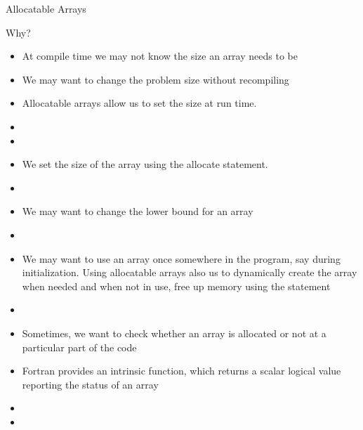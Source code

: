 \documentclass[10pt,t]{beamer}
\begin{document}
\begin{frame}{Allocatable Arrays}
  \begin{block}{\scriptsize Why?}
    \begin{itemize}
      \item At compile time we may not know the size an array needs to be
      \item We may want to change the problem size without recompiling
    \end{itemize}
  \end{block}
  \begin{itemize}
    \item Allocatable arrays allow us to set the size at run time.
    \item[] 
    \item[] 
    \item We set the size of the array using the allocate statement.
    \item[] 
    \item We may want to change the lower bound for an array
    \item[] 
    \item We may want to use an array once somewhere in the program, say during initialization. Using allocatable arrays also us to dynamically create the array when needed and when not in use, free up memory using the  statement
    \item[] 
    \item Sometimes, we want to check whether an array is allocated or not at a particular part of the code
    \item Fortran provides an intrinsic function,  which returns a scalar logical value reporting the status of an array
    \item[] 
    \item[] 
  \end{itemize}
\end{frame}
\end{document}
